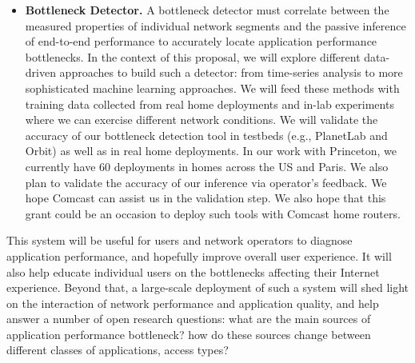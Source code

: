 \documentclass[11 pt]{article}
\begin{document}
\begin{itemize}
%

\item \textbf{Bottleneck Detector.} A bottleneck detector must correlate between the measured properties of individual network segments and the passive inference of end-to-end performance to accurately locate application performance bottlenecks. In the context of this proposal, we will explore different data-driven approaches to build such a detector: from time-series analysis to more sophisticated machine learning approaches. We will feed these methods with training data collected from real home deployments and in-lab experiments where we can exercise different network conditions. We will validate the accuracy of our bottleneck detection tool in testbeds (e.g., PlanetLab
and Orbit)
as well as in real home deployments. In our work with Princeton, we currently have 60 deployments in homes across the US and Paris. We also plan to validate the accuracy of our inference via operator's feedback. We hope Comcast can assist us in the validation step. We also hope that this grant could be an occasion to deploy such tools with Comcast home routers.
\end{itemize}

This system will be useful for users and network operators to diagnose application performance, and hopefully improve overall user experience. It will also help educate individual users on the bottlenecks affecting their Internet experience. Beyond that, a large-scale deployment of such a system will shed light on the interaction of network performance and application quality, and help answer a number of open research questions: what are the main sources of application performance bottleneck? how do these sources change between different classes of applications, access types?\\
\end{document}
